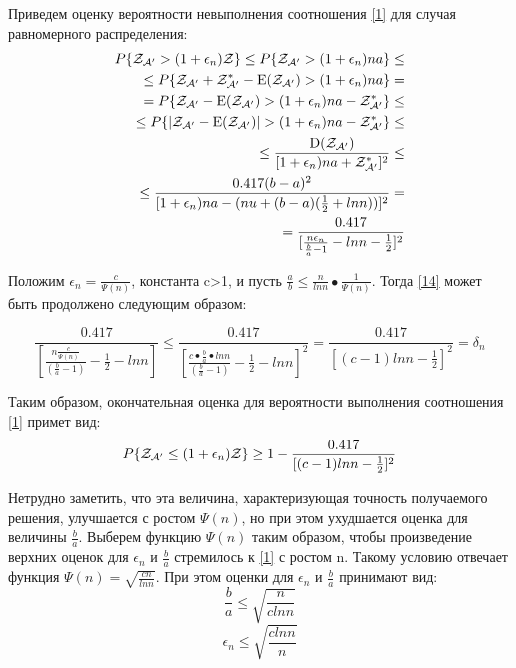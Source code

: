\documentclass[a4paper, 14pt]{extarticle}
\begin{document}
Приведем оценку вероятности невыполнения соотношения \ref{1} для случая равномерного распределения:
\begin{equation}\label{14}
\begin{aligned}
P\{ \text{$\mathcal{Z_{A'}}$} > (1+\epsilon_n) \mathcal{Z} \} \leq P\{ \text{$\mathcal{Z_{A'}}$} > (1+\epsilon_n)na \} \leq \\
\leq P\{ \text{$\mathcal{Z_{A'}}$} + \text{$\mathcal{Z^*_{A'}}$} - \text{E($\mathcal{Z_{A'}}$)} > (1+\epsilon_n)na \} = \\
= P \{ \text{$\mathcal{Z_{A'}}$} - \text{E($\mathcal{Z_{A'}}$)} > (1+\epsilon_n)na - \text{$\mathcal{Z^*_{A'}}$} \} \leq \\
\leq P \{ |\text{$\mathcal{Z_{A'}}$} - \text{E($\mathcal{Z_{A'}}$)}| > (1+\epsilon_n)na - \text{$\mathcal{Z^*_{A'}}$} \} \leq \\
\leq \frac{\text{D($\mathcal{Z_{A'}}$)}}{[1+\epsilon_n)na + \text{$\mathcal{Z^*_{A'}}$}]^2} \leq \\
\leq \frac{0.417(b-a)^2}{[1+\epsilon_n)na-(nu+(b-a)(\frac{1}{2}+ln n))]^2} = \\
= \frac{0.417}{[\frac{n\epsilon_n}{\frac{b}{a}-1}-ln n -\frac{1}{2}]^2}
\end{aligned}
\end{equation}

Положим $\epsilon_n = \frac{c}{\Psi(n)}$, константа c>1, и пусть $\frac{a}{b} \leq \frac{n}{ln n} • \frac{1}{\Psi(n)}$. Тогда \ref{14} может быть продолжено следующим образом:

\begin{equation}
\frac{0.417}{[\frac{n\frac{c}{\Psi(n)}}{(\frac{b}{a}-1)}-\frac{1}{2}-lnn]} \leq \frac{0.417}{[\frac{c•\frac{b}{a}•lnn}{(\frac{b}{a}-1)}-\frac{1}{2}-lnn]^2} = \frac{0.417}{[(c-1)lnn-\frac{1}{2}]^2} = \delta_n
\end{equation}

Таким образом, окончательная оценка для вероятности выполнения соотношения \ref{1} примет вид:
\begin{equation}\label{15}
P \{ \text{$\mathcal{Z_{A'}}$} \leq (1+\epsilon_n)\mathcal{Z} \} \geq 1 - \frac{0.417}{[(c-1)lnn-\frac{1}{2}]^2}
\end{equation}

Нетрудно заметить, что эта величина, характеризующая точность получаемого решения, улучшается с ростом $\Psi(n)$, но при этом ухудшается оценка для величины $\frac{b}{a}$. Выберем функцию $\Psi(n)$ таким образом, чтобы произведение верхних оценок для $\epsilon_n$ и $\frac{b}{a}$ стремилось к \ref{1} с ростом n. Такому условию отвечает функция $\Psi(n) = \sqrt{\frac{cn}{lnn}}$. При этом оценки для $\epsilon_n$ и $\frac{b}{a}$ принимают вид:
\begin{equation}\label{16}
\frac{b}{a} \leq \sqrt{\frac{n}{clnn}}
\end{equation}
\begin{equation}\label{17}
\epsilon_n \leq \sqrt{\frac{clnn}{n}}
\end{equation}
\end{document}
